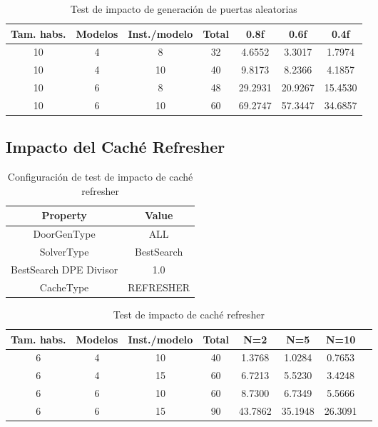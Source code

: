 \begin{table}[H]
\begin{center}
	\begin{tabular}{ | c | c | c | c | c | c | c | }
\hline
Tam. habs. & Modelos & Inst./modelo & Total & 0.8f & 0.6f & 0.4f \\ \hline 
10 & 4 & 8 & 32 & 4.6552 & 3.3017 & 1.7974 \\ 
10 & 4 & 10 & 40 & 9.8173 & 8.2366 & 4.1857 \\ 
10 & 6 & 8 & 48 & 29.2931 & 20.9267 & 15.4530 \\ 
10 & 6 & 10 & 60 & 69.2747 & 57.3447 & 34.6857 \\ 
\hline
	\end{tabular}
\end{center}
\caption{Test de impacto de generación de puertas aleatorias}
\label{table:randoors}
\end{table}


\subsection{Impacto del Caché Refresher}

\begin{table}[H]
\begin{center}
	\begin{tabular}{ | c | c | }
\hline
 		Property & Value \\ \hline
DoorGenType & ALL \\ 
SolverType & BestSearch \\ 
BestSearch DPE Divisor & 1.0 \\ 
CacheType & REFRESHER \\ 
\hline
	\end{tabular}
\end{center}
\caption{Configuración de test de impacto de caché refresher}
\label{table:cfg-refresher}
\end{table}



\begin{table}[H]
\begin{center}
	\begin{tabular}{ | c | c | c | c | c | c | c | c |}
\hline
Tam. habs. & Modelos & Inst./modelo & Total & N=2 & N=5 & N=10 \\ \hline 
6 & 4 & 10 & 40 & 1.3768 & 1.0284 & 0.7653 \\ 
6 & 4 & 15 & 60 & 6.7213 & 5.5230 & 3.4248 \\ 
6 & 6 & 10 & 60 & 8.7300 & 6.7349 & 5.5666 \\ 
6 & 6 & 15 & 90 & 43.7862 & 35.1948 & 26.3091 \\ 
\hline
	\end{tabular}
\end{center}
\caption{Test de impacto de caché refresher}
\label{table:refresher}
\end{table}


